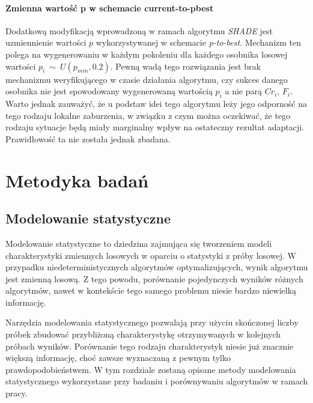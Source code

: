 \documentclass[12pt,a4paper]{report}
\begin{document}
{{{\begin{description}
\subsubsection{Zmienna wartość p w schemacie current-to-pbest}
\par{
Dodatkową modyfikacją wprowadzoną w ramach algorytmu \emph{SHADE} jest uzmiennienie wartości $p$ wykorzystywanej w schemacie \emph{p-to-best}. Mechanizm ten polega na wygenerowaniu w każdym pokoleniu dla każdego osobnika losowej wartości $p_i~\sim~U(p_{min}, 0.2)$. Pewną wadą tego rozwiązania jest brak mechanizmu weryfikującego w czasie działania algorytmu, czy sukces danego osobnika nie jest spowodowany wygenerowaną wartością $p_i$ a nie parą $Cr_i$, $F_i$. Warto jednak zauważyć, że u podstaw idei tego algorytmu leży jego odporność na tego rodzaju lokalne zaburzenia, w związku z czym można oczekiwać, że tego rodzaju sytuacje będą miały marginalny wpływ na ostateczny rezultat adaptacji. Prawidłowość ta nie została jednak zbadana.
}
\end{description}

\chapter{Metodyka badań}
\section{Modelowanie statystyczne}
\par{
Modelowanie statystyczne to dziedzina zajmująca się tworzeniem modeli charakterystyki zmiennych losowych w oparciu o statystyki z próby losowej. W przypadku niedeterministycznych algorytmów optymalizujących, wynik algorytmu jest zmienną losową. Z tego powodu, porównanie pojedynczych wyników różnych algorytmów, nawet w kontekście tego samego problemu niesie bardzo niewielką informację.
}
\par{
Narzędzia modelowania statystycznego pozwalają przy użyciu skończonej liczby próbek zbudować przybliżoną charakterystykę otrzymywanych w kolejnych próbach wyników. Porównanie tego rodzaju charakterystyk niesie już znacznie większą informację, choć zawsze wyznaczaną z pewnym tylko prawdopodobieństwem. W tym rozdziale zostaną opisane metody modelowania statystycznego wykorzystane przy badaniu i porównywaniu algorytmów w ramach pracy.
}
}}}
\end{document}
